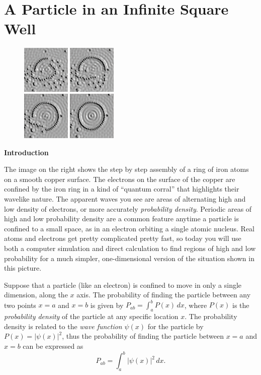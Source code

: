 \section{A Particle in an Infinite Square Well}

\makelabheader %

\bigskip

\begin{figure}
\begin{center}
\includegraphics[width=0.42\textwidth]{particle_in_infinite_well/quantum_corral.eps}
\end{center}
\end{figure}

\textbf{Introduction}

The image on the right shows the step by step assembly of a ring of iron atoms on a smooth copper surface.  The  electrons on the surface of the copper are confined by the iron ring in a kind of ``quantum corral'' that highlights their wavelike nature. The apparent waves you see are areas of alternating high and low density of electrons, or more accurately \textit{probability density}.  Periodic areas of high and low probability density are a common feature anytime a particle is confined to a small space, as in an electron orbiting a single atomic nucleus.  Real atoms and electrons get pretty complicated pretty fast, so today you will use both a computer simulation and direct calculation to find regions of high and low probability for a much simpler, one-dimensional version of the situation shown in this picture.

Suppose that a particle (like an electron) is confined to move in only a single dimension, along the $x$ axis.  
The probability of finding the particle between any two points $x=a$ and $x=b$ is given by 
$P_{ab} = \int_a^b P(x)  \, dx$, where $P(x)$ is the \textit{probability density} of the particle at any specific location $x$.  The probability density is related to the \textit{wave function} $\psi(x)$ for the particle by 
$P(x)=\left|\psi(x)\right|^2$, thus the probability of finding the particle between $x=a$ and $x=b$ can be expressed as
$$P_{ab} = \int_a^b \left|\psi(x)\right|^2  \, dx.$$

